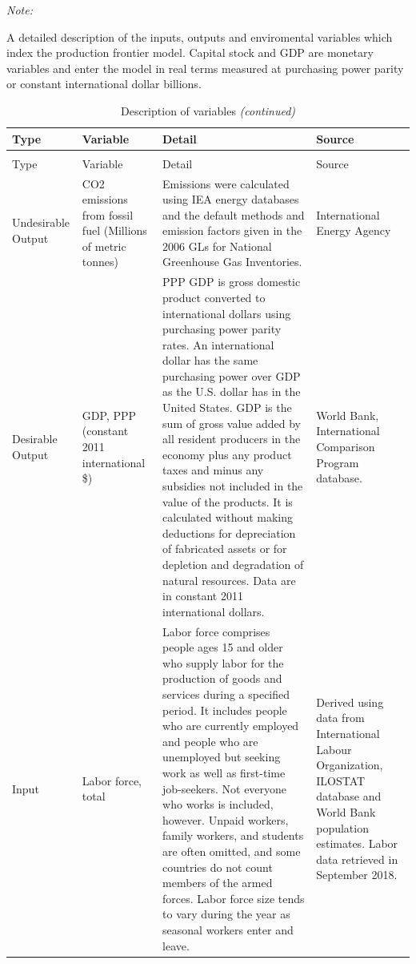 \documentclass[12pt,]{article}
\begin{document}
\begin{ThreePartTable}
\begin{TableNotes}
\item \textit{Note: } 
\item A detailed description of the inputs, outputs and enviromental variables which index the production frontier model.  Capital stock and GDP are monetary variables and enter the model in real terms measured at purchasing power parity or constant international dollar billions.
\end{TableNotes}
\begin{longtable}[t]{>{\raggedright\arraybackslash}p{10em}>{\raggedright\arraybackslash}p{10em}>{\raggedright\arraybackslash}p{10em}>{\raggedright\arraybackslash}p{10em}}
\caption{\label{tab:VarsDescript}Description of variables}\\
\toprule
Type & Variable & Detail & Source\\
\midrule
\endfirsthead
\caption[]{\label{tab:VarsDescript}Description of variables \textit{(continued)}}\\
\toprule
Type & Variable & Detail & Source\\
\midrule
\endhead
\
\endfoot
\bottomrule
\insertTableNotes
\endlastfoot
Undesirable Output & CO2 emissions from fossil fuel (Millions of metric tonnes) & Emissions were calculated using IEA energy databases and the default methods and emission factors given in the 2006 GLs for National Greenhouse Gas Inventories. & International Energy Agency\\
Desirable Output & GDP, PPP (constant 2011 international \$) & PPP GDP is gross domestic product converted to international dollars using purchasing power parity rates. An international dollar has the same purchasing power over GDP as the U.S. dollar has in the United States. GDP is the sum of gross value added by all resident producers in the economy plus any product taxes and minus any subsidies not included in the value of the products. It is calculated without making deductions for depreciation of fabricated assets or for depletion and degradation of natural resources. Data are in constant 2011 international dollars. & World Bank, International Comparison Program database.\\
Input & Labor force, total & Labor force comprises people ages 15 and older who supply labor for the production of goods and services during a specified period. It includes people who are currently employed and people who are unemployed but seeking work as well as first-time job-seekers. Not everyone who works is included, however. Unpaid workers, family workers, and students are often omitted, and some countries do not count members of the armed forces. Labor force size tends to vary during the year as seasonal workers enter and leave. & Derived using data from International Labour Organization, ILOSTAT database and World Bank population estimates. Labor data retrieved in September 2018.\\

\end{longtable}
\end{ThreePartTable}
\end{document}
